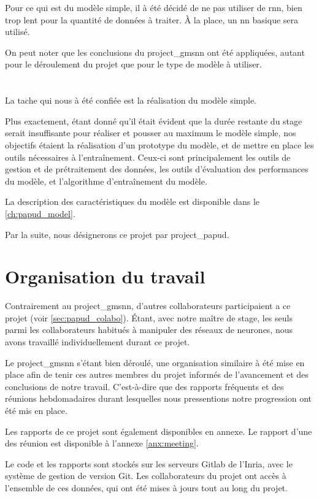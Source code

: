 Pour ce qui est du modèle simple, il à été décidé de ne pas utiliser de \gls{rnn}, bien trop lent pour la quantité de données à traiter. À la place, un \gls{nn} basique sera utilisé.

On peut noter que les conclusions du \gls{project_gmsnn} ont été appliquées, autant pour le déroulement du projet que pour le type de modèle à utiliser.


\section{}
La tache qui nous à été confiée est la réalisation du modèle simple.

Plus exactement, étant donné qu'il était évident que la durée restante du stage serait insuffisante pour réaliser et pousser au maximum le modèle simple, nos objectifs étaient la réalisation d'un prototype du modèle, et de mettre en place les outils nécessaires à l'entraînement.
Ceux-ci sont principalement les outils de gestion et de prétraitement des données, les outils d'évaluation des performances du modèle, et l'algorithme d'entraînement du modèle.

La description des caractéristiques du modèle est disponible dans le \autoref{ch:papud_model}.

Par la suite, nous désignerons ce projet par \og \gls{project_papud}\fg{}.

\section{Organisation du travail}
Contrairement au \gls{project_gmsnn}, d'autres collaborateurs participaient a ce projet (voir \autoref{sec:papud_colabo}).
Étant, avec notre maître de stage, les seuls parmi les collaborateurs habitués à manipuler des réseaux de neurones, nous avons travaillé individuellement durant ce projet.

Le \gls{project_gmsnn} s'étant bien déroulé, une organisation similaire à été mise en place afin de tenir ces autres membres du projet informés de l'avancement et des conclusions de notre travail.
C'est-à-dire que des rapports fréquents et des réunions hebdomadaires durant lesquelles nous pressentions notre progression ont été mis en place.

Les rapports de ce projet sont également disponibles en annexe.
Le rapport d'une des réunion est disponible à l'annexe \ref{anx:meeting}. %

Le code et les rapports sont stockés sur les serveurs Gitlab de l'Inria, avec le système de gestion de version Git. Les collaborateurs du projet ont accès à l'ensemble de ces données, qui ont été mises à jours tout au long du projet.

